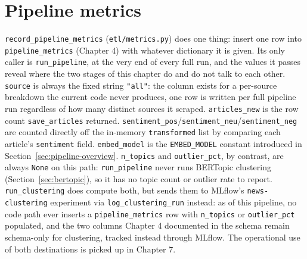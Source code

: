 \section{Pipeline metrics}
\label{sec:metrics}
\texttt{record\_pipeline\_metrics} (\texttt{etl/\allowbreak metrics.py}) does one thing: insert one row into \texttt{pipeline\_metrics} (Chapter 4) with whatever dictionary it is given. Its only caller is \texttt{run\_pipeline}, at the very end of every full run, and the values it passes reveal where the two stages of this chapter do and do not talk to each other. \texttt{source} is always the fixed string \texttt{"all"}: the column exists for a per-source breakdown the current code never produces, one row is written per full pipeline run regardless of how many distinct sources it scraped. \texttt{articles\_new} is the row count \texttt{save\_articles} returned. \texttt{sentiment\_pos}/\texttt{sentiment\_neu}/\texttt{sentiment\_neg} are counted directly off the in-memory \texttt{transformed} list by comparing each article's \texttt{sentiment} field. \texttt{embed\_model} is the \texttt{EMBED\_MODEL} constant introduced in Section~\ref{sec:pipeline-overview}. \texttt{n\_topics} and \texttt{outlier\_pct}, by contrast, are always \texttt{None} on this path: \texttt{run\_pipeline} never runs BERTopic clustering (Section~\ref{sec:bertopic}), so it has no topic count or outlier rate to report. \texttt{run\_clustering} does compute both, but sends them to MLflow's \texttt{news-clustering} experiment via \texttt{log\_clustering\_run} instead: as of this pipeline, no code path ever inserts a \texttt{pipeline\_metrics} row with \texttt{n\_topics} or \texttt{outlier\_pct} populated, and the two columns Chapter 4 documented in the schema remain schema-only for clustering, tracked instead through MLflow. The operational use of both destinations is picked up in Chapter 7.

